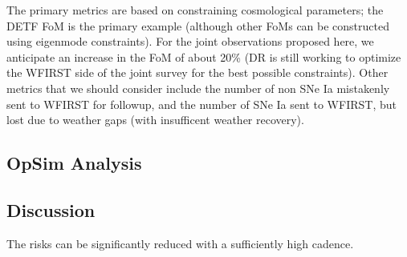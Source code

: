 
The primary metrics are based on constraining cosmological parameters; the DETF FoM is the primary example (although other FoMs can be constructed using eigenmode constraints). For the joint observations proposed here, we anticipate an increase in the FoM of about 20\% (DR is still working to optimize the WFIRST side of the joint survey for the best possible constraints). Other metrics that we should consider include the number of non SNe Ia mistakenly sent to WFIRST for followup, and the number of SNe Ia sent to WFIRST, but lost due to weather gaps (with insufficent weather recovery).


\subsection{OpSim Analysis}
\label{sec:\secname:analysis}




\subsection{Discussion}
\label{sec:\secname:discussion}


The risks can be significantly reduced with a sufficiently high cadence. 



\navigationbar
